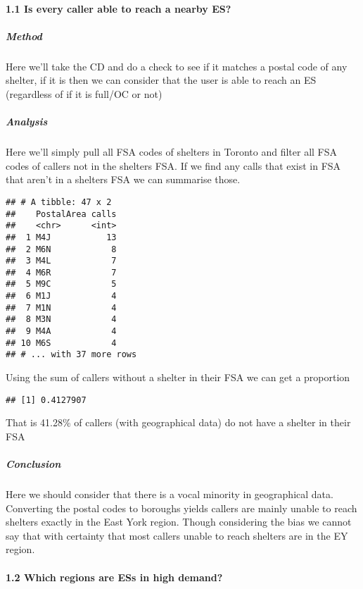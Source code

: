 \documentclass[
]{article}
\begin{document}
\hypertarget{is-every-caller-able-to-reach-a-nearby-es}{%
\paragraph{1.1 Is every caller able to reach a nearby
ES?}\label{is-every-caller-able-to-reach-a-nearby-es}}

\hypertarget{method-1}{%
\subparagraph{Method}\label{method-1}}

Here we'll take the CD and do a check to see if it matches a postal code
of any shelter, if it is then we can consider that the user is able to
reach an ES (regardless of if it is full/OC or not)

\hypertarget{analysis-1}{%
\subparagraph{Analysis}\label{analysis-1}}

Here we'll simply pull all FSA codes of shelters in Toronto and filter
all FSA codes of callers not in the shelters FSA. If we find any calls
that exist in FSA that aren't in a shelters FSA we can summarise those.

\begin{verbatim}
## # A tibble: 47 x 2
##    PostalArea calls
##    <chr>      <int>
##  1 M4J           13
##  2 M6N            8
##  3 M4L            7
##  4 M6R            7
##  5 M9C            5
##  6 M1J            4
##  7 M1N            4
##  8 M3N            4
##  9 M4A            4
## 10 M6S            4
## # ... with 37 more rows
\end{verbatim}

Using the sum of callers without a shelter in their FSA we can get a
proportion

\begin{verbatim}
## [1] 0.4127907
\end{verbatim}

That is 41.28\% of callers (with geographical data) do not have a
shelter in their FSA

\hypertarget{conclusion-1}{%
\subparagraph{Conclusion}\label{conclusion-1}}

Here we should consider that there is a vocal minority in geographical
data. Converting the postal codes to boroughs yields callers are mainly
unable to reach shelters exactly in the East York region. Though
considering the bias we cannot say that with certainty that most callers
unable to reach shelters are in the EY region.

\hypertarget{which-regions-are-ess-in-high-demand}{%
\paragraph{1.2 Which regions are ESs in high
demand?}\label{which-regions-are-ess-in-high-demand}}
\end{document}

